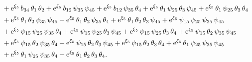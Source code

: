 \documentclass[12pt,a4paper,UTF8]{article}
\numberwithin{equation}{section}
\begin{document}
\begin{equation*}
\begin{aligned}
&+{\rm e}^{{{\xi}_{5}}}\,{{b}_{34}}\,{{\theta}_{1}}\,{{\theta}_{2}}+{\rm e}^{{{\xi}_{5}}}\,{{b}_{12}}\,{{\psi}_{35}}\,{{\psi}_{45}}+{\rm e}^{{{\xi}_{5}}}\,{{b}_{12}}\,{{\psi}_{35}}\,{{\theta}_{4}}+{\rm e}^{{{\xi}_{5}}}\,{{\theta}_{1}}\,{{\psi}_{25}}\,{{\theta}_{3}}\,{{\psi}_{45}}+{\rm e}^{{{\xi}_{5}}}\,{{\theta}_{1}}\,{{\psi}_{25}}\,{{\theta}_{3}}\,{{\theta}_{4}}\\
&+{\rm e}^{{{\xi}_{5}}}\,{{\theta}_{1}}\,{{\theta}_{2}}\,{{\psi}_{35}}\,{{\psi}_{45}}+{\rm e}^{{{\xi}_{5}}}\,{{\theta}_{1}}\,{{\theta}_{2}}\,{{\psi}_{35}}\,{{\theta}_{4}}+{\rm e}^{{{\xi}_{5}}}\,{{\theta}_{1}}\,{{\theta}_{2}}\,{{\theta}_{3}}\,{{\psi}_{45}}+{\rm e}^{{{\xi}_{5}}}\,{{\psi}_{15}}\,{{\psi}_{25}}\,{{\psi}_{35}}\,{{\psi}_{45}}\\
&+{\rm e}^{{{\xi}_{5}}}\,{{\psi}_{15}}\,{{\psi}_{25}}\,{{\psi}_{35}}\,{{\theta}_{4}}+{\rm e}^{{{\xi}_{5}}}\,{{\psi}_{15}}\,{{\psi}_{25}}\,{{\theta}_{3}}\,{{\psi}_{45}}+{\rm e}^{{{\xi}_{5}}}\,{{\psi}_{15}}\,{{\psi}_{25}}\,{{\theta}_{3}}\,{{\theta}_{4}}+{\rm e}^{{{\xi}_{5}}}\,{{\psi}_{15}}\,{{\theta}_{2}}\,{{\psi}_{35}}\,{{\psi}_{45}}\\
&+{\rm e}^{{{\xi}_{5}}}\,{{\psi}_{15}}\,{{\theta}_{2}}\,{{\psi}_{35}}\,{{\theta}_{4}}+{\rm e}^{{{\xi}_{5}}}\,{{\psi}_{15}}\,{{\theta}_{2}}\,{{\theta}_{3}}\,{{\psi}_{45}}+{\rm e}^{{{\xi}_{5}}}\,{{\psi}_{15}}\,{{\theta}_{2}}\,{{\theta}_{3}}\,{{\theta}_{4}}+{\rm e}^{{{\xi}_{5}}}\,{{\theta}_{1}}\,{{\psi}_{25}}\,{{\psi}_{35}}\,{{\psi}_{45}}\\
&+{\rm e}^{{{\xi}_{5}}}\,{{\theta}_{1}}\,{{\psi}_{25}}\,{{\psi}_{35}}\,{{\theta}_{4}}+{\rm e}^{{{\xi}_{5}}}\,{{\theta}_{1}}\,{{\theta}_{2}}\,{{\theta}_{3}}\,{{\theta}_{4}} .
\end{aligned}
\end{equation*}
\end{document}
